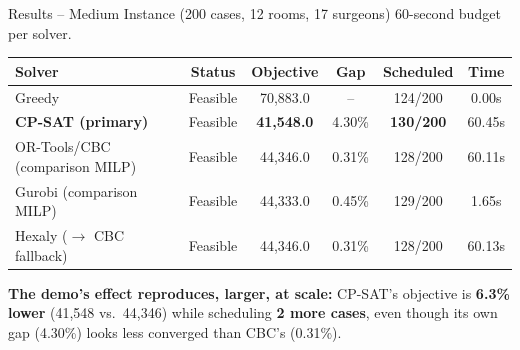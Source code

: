 \documentclass[aspectratio=169]{beamer}
\begin{document}
\begin{frame}{Results -- Medium Instance (200 cases, 12 rooms, 17 surgeons)}
  \footnotesize 60-second budget per solver.
  \begin{table}
    \centering\footnotesize
    \begin{tabular}{lccccc}
      \toprule
      Solver & Status & Objective & Gap & Scheduled & Time \\
      \midrule
      Greedy & Feasible & 70{,}883.0 & -- & 124/200 & 0.00s \\
      \textbf{CP-SAT (primary)} & Feasible & \textbf{41{,}548.0} & 4.30\% & \textbf{130/200} & 60.45s \\
      OR-Tools/CBC (comparison MILP) & Feasible & 44{,}346.0 & 0.31\% & 128/200 & 60.11s \\
      Gurobi (comparison MILP) & Feasible & 44{,}333.0 & 0.45\% & 129/200 & 1.65s \\
      Hexaly ($\to$ CBC fallback) & Feasible & 44{,}346.0 & 0.31\% & 128/200 & 60.13s \\
      \bottomrule
    \end{tabular}
  \end{table}
  \vfill
  \textbf{The demo's effect reproduces, larger, at scale:} CP-SAT's objective is
  \textbf{6.3\% lower} (41{,}548 vs.\ 44{,}346) while scheduling \textbf{2 more cases},
  even though its own gap (4.30\%) looks less converged than CBC's (0.31\%).
\end{frame}
\end{document}
